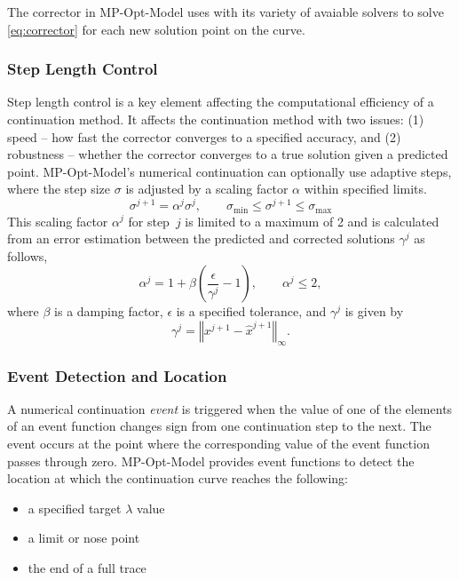 \documentclass[12pt]{article}
\newcommand{\mpom}[0]{\mbox{MP-Opt-Model}}
\newcommand{\code}[1]{{\relsize{-0.5}{\tt{{#1}}}}}  %
\numberwithin{equation}{section}
\numberwithin{table}{section}
\numberwithin{figure}{section}
\begin{document}
The corrector in \mpom{} uses \code{nleqs\_master} with its variety of avaiable solvers to solve \eqref{eq:corrector} for each new solution point on the curve.

\subsubsection{Step Length Control}
Step length control is a key element affecting the computational efficiency of a continuation method. It affects the continuation method with two issues: (1) speed -- how fast the corrector converges to a specified accuracy, and (2) robustness -- whether the corrector converges to a true solution given a predicted point. \mpom{}'s numerical continuation can optionally use adaptive steps, where the step size $\sigma$ is adjusted by a scaling factor $\alpha$ within specified limits.
\begin{equation}
 \sigma^{j+1} = \alpha^j \sigma^j, \qquad \sigma_\mathrm{min} \le \sigma^{j+1} \le \sigma_\mathrm{max}
 \label{eq:step_adapt1}
\end{equation}
This scaling factor $\alpha^j$ for step~$j$ is limited to a maximum of 2 and is calculated from an error estimation between the predicted and corrected solutions $\gamma^j$ as follows,
\begin{equation}
 \alpha^j = 1 + \beta \left(\dfrac{\epsilon}{\gamma^j} - 1\right), \qquad \alpha^j \le 2,
 \label{eq:step_adapt2}
\end{equation}
where $\beta$ is a damping factor, $\epsilon$ is a specified tolerance, and $\gamma^j$ is given by
\begin{equation}
 \gamma^j = \left\Vert x^{j+1} - \hat{x}^{j+1}\right\Vert_\infty.
 \label{eq:step_adapt3}
\end{equation}

\subsubsection{Event Detection and Location}
A numerical continuation \emph{event} is triggered when the value of one of the elements of an event function changes sign from one continuation step to the next. The event occurs at the point where the corresponding value of the event function passes through zero. \mpom{} provides event functions to detect the location at which the continuation curve reaches the following:
\begin{itemize}
    \setlength{\parskip}{-3pt}
    \item a specified target $\lambda$ value
    \item a limit or nose point
    \item the end of a full trace
\end{itemize}
\end{document}
